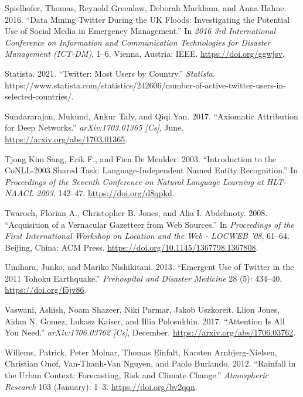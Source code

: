 \documentclass[a4paper, notitlepage]{extreport}
\newlength{\cslhangindent}
\newenvironment{CSLReferences}[2] %
 {%
  \setlength{\parindent}{0pt}
  \ifodd #1 \everypar{\setlength{\hangindent}{\cslhangindent}}\ignorespaces\fi
  \ifnum #2 > 0
  \setlength{\parskip}{#2\baselineskip}
  \fi
 }%
 {}
\begin{document}
\begin{CSLReferences}{1}{0}
\leavevmode{}%
Spielhofer, Thomas, Reynold Greenlaw, Deborah Markham, and Anna Hahne.
2016. {``Data Mining {Twitter} During the {UK} Floods: {Investigating}
the Potential Use of Social Media in Emergency Management.''} In
\emph{2016 3rd {International Conference} on {Information} and
{Communication Technologies} for {Disaster Management} ({ICT}-{DM})},
1--6. {Vienna, Austria}: {IEEE}. \url{https://doi.org/ggwjsv}.

\leavevmode{}%
Statista. 2021. {``Twitter: Most Users by Country.''} \emph{Statista}.
https://www.statista.com/statistics/242606/number-of-active-twitter-users-in-selected-countries/.

\leavevmode{}%
Sundararajan, Mukund, Ankur Taly, and Qiqi Yan. 2017. {``Axiomatic
{Attribution} for {Deep Networks}.''} \emph{arXiv:1703.01365 {[}Cs{]}},
June. \url{https://arxiv.org/abs/1703.01365}.

\leavevmode{}%
Tjong Kim Sang, Erik F., and Fien De Meulder. 2003. {``Introduction to
the {CoNLL}-2003 {Shared Task}: {Language}-{Independent Named Entity
Recognition}.''} In \emph{Proceedings of the {Seventh Conference} on
{Natural Language Learning} at {HLT}-{NAACL} 2003}, 142--47.
\url{https://doi.org/d8qpkd}.

\leavevmode{}%
Twaroch, Florian A., Christopher B. Jones, and Alia I. Abdelmoty. 2008.
{``Acquisition of a Vernacular Gazetteer from Web Sources.''} In
\emph{Proceedings of the First International Workshop on {Location} and
the Web - {LOCWEB} '08}, 61--64. {Beijing, China}: {ACM Press}.
\url{https://doi.org/10.1145/1367798.1367808}.

\leavevmode{}%
Umihara, Junko, and Mariko Nishikitani. 2013. {``Emergent {Use} of
{Twitter} in the 2011 {Tohoku Earthquake}.''} \emph{Prehospital and
Disaster Medicine} 28 (5): 434--40. \url{https://doi.org/f5jv86}.

\leavevmode{}%
Vaswani, Ashish, Noam Shazeer, Niki Parmar, Jakob Uszkoreit, Llion
Jones, Aidan N. Gomez, Lukasz Kaiser, and Illia Polosukhin. 2017.
{``Attention {Is All You Need}.''} \emph{arXiv:1706.03762 {[}Cs{]}},
December. \url{https://arxiv.org/abs/1706.03762}.

\leavevmode{}%
Willems, Patrick, Peter Molnar, Thomas Einfalt, Karsten
Arnbjerg-Nielsen, Christian Onof, Van-Thanh-Van Nguyen, and Paolo
Burlando. 2012. {``Rainfall in the Urban Context: {Forecasting}, Risk
and Climate Change.''} \emph{Atmospheric Research} 103 (January): 1--3.
\url{https://doi.org/bv2qqn}.


\end{CSLReferences}
\end{document}
